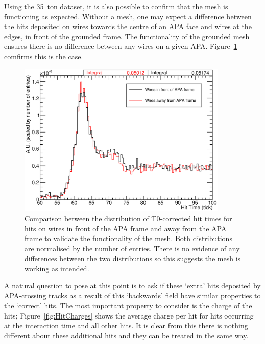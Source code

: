 Using the 35~ton dataset, it is also possible to confirm that the mesh is functioning as expected.  Without a mesh, one may expect a difference between the hits deposited on wires towards the centre of an APA face and wires at the edges, in front of the grounded frame.  The functionality of the grounded mesh ensures there is no difference between any wires on a given APA.  Figure~\ref{fig:HitTimesFrame} comfirms this is the case.

\begin{figure}
  \centering
  \includegraphics[width=10cm]{HitTimesFrame.eps}
  \caption[Comparison between the distribution of T0-corrected hit times for hits on wires in front of the APA frame and away from the APA frame to validate the functionality of the mesh.]{Comparison between the distribution of T0-corrected hit times for hits on wires in front of the APA frame and away from the APA frame to validate the functionality of the mesh.  Both distributions are normalised by the number of entries.  There is no evidence of any differences between the two distributions so this suggests the mesh is working as intended.}
  \label{fig:HitTimesFrame}
\end{figure}

A natural question to pose at this point is to ask if these `extra' hits deposited by APA-crossing tracks as a result of this `backwards' field have similar properties to the `correct' hits.  The most important property to consider is the charge of the hits; Figure~\ref{fig:HitCharges} shows the average charge per hit for hits occurring at the interaction time and all other hits.  It is clear from this there is nothing different about these additional hits and they can be treated in the same way.

